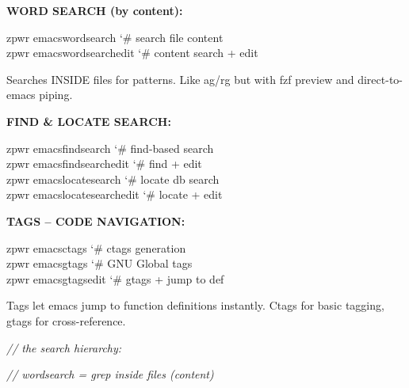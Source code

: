 \documentclass[11pt,a4paper,twoside]{book}
\begin{document}
\vspace{12pt}
{\bfseries\color{neonyellow} WORD SEARCH (by content):}\vspace{4pt}

\begin{codebox}
\color{neongreen}zpwr emacswordsearch        {\char`\#} search file content\\
\color{neongreen}zpwr emacswordsearchedit    {\char`\#} content search + edit\\
\end{codebox}

Searches INSIDE files for patterns. Like ag/rg but with fzf preview and direct-to-emacs piping.


\vspace{12pt}
{\bfseries\color{neonyellow} FIND \& LOCATE SEARCH:}\vspace{4pt}

\begin{codebox}
\color{neongreen}zpwr emacsfindsearch        {\char`\#} find-based search\\
\color{neongreen}zpwr emacsfindsearchedit    {\char`\#} find + edit\\
\color{neongreen}zpwr emacslocatesearch      {\char`\#} locate db search\\
\color{neongreen}zpwr emacslocatesearchedit  {\char`\#} locate + edit\\
\end{codebox}


\vspace{12pt}
{\bfseries\color{neonyellow} TAGS -- CODE NAVIGATION:}\vspace{4pt}

\begin{codebox}
\color{neongreen}zpwr emacsctags             {\char`\#} ctags generation\\
\color{neongreen}zpwr emacsgtags             {\char`\#} GNU Global tags\\
\color{neongreen}zpwr emacsgtagsedit         {\char`\#} gtags + jump to def\\
\end{codebox}

Tags let emacs jump to function definitions instantly. Ctags for basic tagging, gtags for cross-reference.

{\small\itshape\color{dimtext} // the search hierarchy:}

{\small\itshape\color{dimtext} //   wordsearch  = grep inside files (content)}
\end{document}
